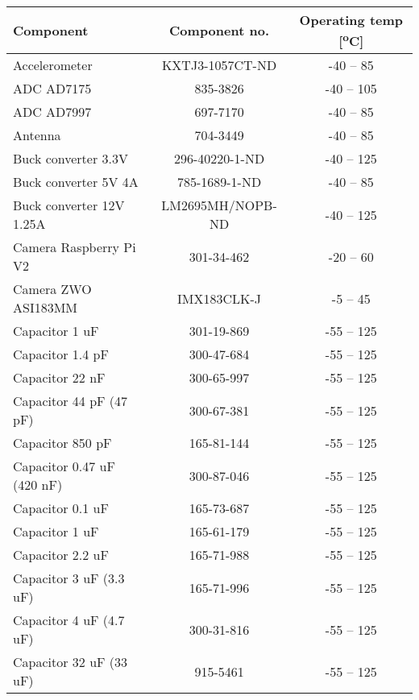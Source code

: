 
\begin{center}
\begin{table}[H]
\centering
\footnotesize
\begin{tabular}{ | l | c | c |}
    \hline
    \textbf{Component} & \textbf{Component no.} & \textbf{Operating temp [\textsuperscript{o}C]} \\ 
    \hline
    Accelerometer & KXTJ3-1057CT-ND & -40 – 85 \\ 
    \hline
    ADC AD7175 & 835-3826 & -40 – 105 \\ 
    \hline
    ADC AD7997 & 697-7170 & -40 – 85 \\ 
    \hline
    Antenna & 704-3449 & -40 – 85 \\ 
    \hline
    Buck converter 3.3V & 296-40220-1-ND & -40 – 125 \\ 
    \hline
    Buck converter 5V 4A & 785-1689-1-ND & -40 – 85 \\ 
    \hline
    Buck converter 12V 1.25A & LM2695MH/NOPB-ND & -40 – 125 \\ 
    \hline
    Camera Raspberry Pi V2 & 301-34-462 & -20 – 60 \\ 
    \hline
    Camera  ZWO ASI183MM & IMX183CLK-J & -5 – 45 \\ 
    \hline
    Capacitor 1 uF & 301-19-869 & -55 – 125 \\ 
    \hline
    Capacitor 1.4 pF & 300-47-684 & -55 – 125\\ 
    \hline
    Capacitor 22 nF & 300-65-997 & -55 – 125 \\ 
    \hline
    Capacitor 44 pF (47 pF) & 300-67-381 & -55 – 125 \\ 
    \hline
    Capacitor 850 pF & 165-81-144 & -55 – 125 \\ 
    \hline
    Capacitor 0.47 uF (420 nF) & 300-87-046 & -55 – 125 \\ 
    \hline
    Capacitor 0.1 uF & 165-73-687 & -55 – 125 \\ 
    \hline
    Capacitor 1 uF & 165-61-179 & -55 – 125 \\ 
    \hline
    Capacitor 2.2 uF & 165-71-988 & -55 – 125 \\ 
    \hline
    Capacitor 3 uF (3.3 uF) & 165-71-996 & -55 – 125 \\ 
    \hline
    Capacitor 4 uF (4.7 uF) & 300-31-816 & -55 – 125 \\ 
    \hline
    Capacitor 32 uF (33 uF) & 915-5461 & -55 – 125 \\ 

\end{tabular}
\end{table}
\end{center}

